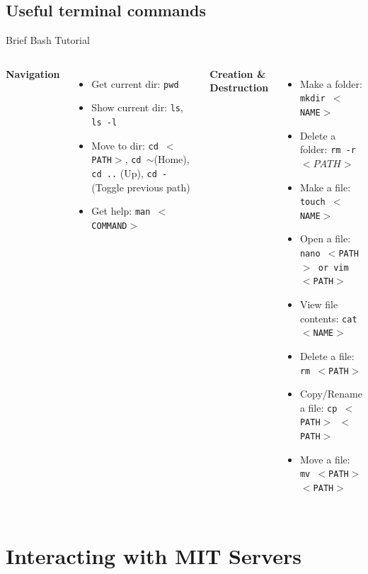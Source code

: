 \documentclass{beamer}
\begin{document}
\subsection{Useful terminal commands}
\begin{frame}{Brief Bash Tutorial}
    \begin{columns}[c] 
            \textbf{Navigation}
            \begin{itemize}
                \item Get current dir: \texttt{pwd}
                \item Show current dir: \texttt{ls}, \texttt{ls -l}
                \item Move to dir: \texttt{cd $<$PATH$>$}, \texttt{cd $\sim$}(Home), \texttt{cd ..} (Up), \texttt{cd -} (Toggle previous path)
                \item Get help: \texttt{man $<$COMMAND$>$}
            \end{itemize}
            \textbf{Creation \& Destruction}
            \begin{itemize}
                \item Make a folder: \texttt{mkdir $<$NAME$>$}
                \item Delete a folder: \texttt{rm -r $<PATH>$}
                \item Make a file: \texttt{touch $<$NAME$>$}
                \item Open a file: \texttt{nano $<$PATH$>$ or vim $<$PATH$>$}
                \item View file contents: \texttt{cat $<$NAME$>$}
                \item Delete a file: \texttt{rm $<$PATH$>$}
                \item Copy/Rename a file: \texttt{cp $<$PATH$>$ $<$PATH$>$}
                \item Move a file: \texttt{mv $<$PATH$>$ $<$PATH$>$}
            \end{itemize}
    \end{columns}
\end{frame}

\section{Interacting with MIT Servers}
\end{document}
